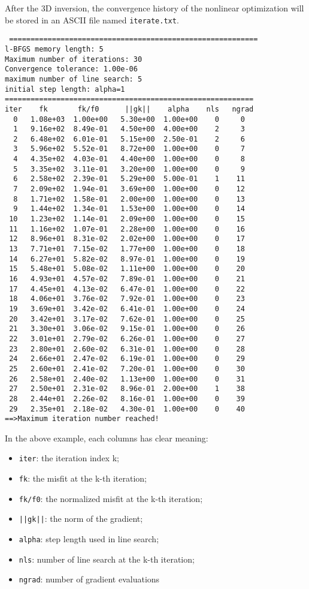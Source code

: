\documentclass[a4paper,10pt]{article}
\begin{document}
After the 3D inversion, the convergence history of the nonlinear optimization will be stored in an ASCII file named \verb|iterate.txt|.
\begin{verbatim}
 ==========================================================
l-BFGS memory length: 5
Maximum number of iterations: 30
Convergence tolerance: 1.00e-06
maximum number of line search: 5
initial step length: alpha=1
==========================================================
iter    fk       fk/f0      ||gk||    alpha    nls   ngrad
  0   1.08e+03  1.00e+00   5.30e+00  1.00e+00    0     0
  1   9.16e+02  8.49e-01   4.50e+00  4.00e+00    2     3
  2   6.48e+02  6.01e-01   5.15e+00  2.50e-01    2     6
  3   5.96e+02  5.52e-01   8.72e+00  1.00e+00    0     7
  4   4.35e+02  4.03e-01   4.40e+00  1.00e+00    0     8
  5   3.35e+02  3.11e-01   3.20e+00  1.00e+00    0     9
  6   2.58e+02  2.39e-01   5.29e+00  5.00e-01    1    11
  7   2.09e+02  1.94e-01   3.69e+00  1.00e+00    0    12
  8   1.71e+02  1.58e-01   2.00e+00  1.00e+00    0    13
  9   1.44e+02  1.34e-01   1.53e+00  1.00e+00    0    14
 10   1.23e+02  1.14e-01   2.09e+00  1.00e+00    0    15
 11   1.16e+02  1.07e-01   2.28e+00  1.00e+00    0    16
 12   8.96e+01  8.31e-02   2.02e+00  1.00e+00    0    17
 13   7.71e+01  7.15e-02   1.77e+00  1.00e+00    0    18
 14   6.27e+01  5.82e-02   8.97e-01  1.00e+00    0    19
 15   5.48e+01  5.08e-02   1.11e+00  1.00e+00    0    20
 16   4.93e+01  4.57e-02   7.89e-01  1.00e+00    0    21
 17   4.45e+01  4.13e-02   6.47e-01  1.00e+00    0    22
 18   4.06e+01  3.76e-02   7.92e-01  1.00e+00    0    23
 19   3.69e+01  3.42e-02   6.41e-01  1.00e+00    0    24
 20   3.42e+01  3.17e-02   7.62e-01  1.00e+00    0    25
 21   3.30e+01  3.06e-02   9.15e-01  1.00e+00    0    26
 22   3.01e+01  2.79e-02   6.26e-01  1.00e+00    0    27
 23   2.80e+01  2.60e-02   6.31e-01  1.00e+00    0    28
 24   2.66e+01  2.47e-02   6.19e-01  1.00e+00    0    29
 25   2.60e+01  2.41e-02   7.20e-01  1.00e+00    0    30
 26   2.58e+01  2.40e-02   1.13e+00  1.00e+00    0    31
 27   2.50e+01  2.31e-02   8.96e-01  2.00e+00    1    38
 28   2.44e+01  2.26e-02   8.16e-01  1.00e+00    0    39
 29   2.35e+01  2.18e-02   4.30e-01  1.00e+00    0    40
==>Maximum iteration number reached!
\end{verbatim}
In the above example, each columns has clear meaning:
\begin{itemize}
\item \texttt{iter}: the iteration index k;
\item \texttt{fk}: the misfit at the k-th iteration;
\item \texttt{fk/f0}: the normalized misfit at the k-th iteration;
\item \texttt{||gk||}: the norm of the gradient;
\item \texttt{alpha}: step length used in line search;
\item \texttt{nls}: number of line search at the k-th iteration;
\item \texttt{ngrad}: number of gradient evaluations
\end{itemize}
\end{document}
